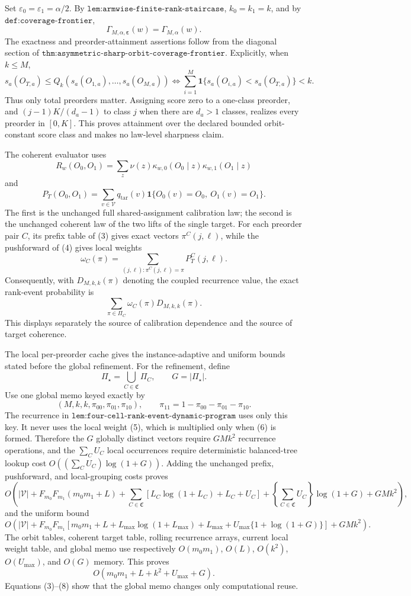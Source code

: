 Set \(\varepsilon_0=\varepsilon_1=\alpha/2\). By \(\texttt{lem:armwise-finite-rank-staircase}\), \(k_0=k_1=k\), and by \(\texttt{def:coverage-frontier}\),
\[
\Gamma_{M,\alpha,\boldsymbol\varepsilon}(w)=\Gamma_{M,\alpha}(w). \tag{1}
\]
The exactness and preorder-attainment assertions follow from the diagonal section of \(\texttt{thm:asymmetric-sharp-orbit-coverage-frontier}\). Explicitly, when \(k\le M\),
\[
s_a(O_{T,a})\le Q_k(s_a(O_{1,a}),\ldots,s_a(O_{M,a}))\Longleftrightarrow\sum_{i=1}^M\mathbf 1\{s_a(O_{i,a})<s_a(O_{T,a})\}<k. \tag{2}
\]
Thus only total preorders matter. Assigning score zero to a one-class preorder, and \((j-1)K/(d_a-1)\) to class \(j\) when there are \(d_a>1\) classes, realizes every preorder in \([0,K]\). This proves attainment over the declared bounded orbit-constant score class and makes no law-level sharpness claim.

The coherent evaluator uses
\[
R_w(O_0,O_1)=\sum_z\nu(z)\kappa_{w,0}(O_0\mid z)\kappa_{w,1}(O_1\mid z) \tag{3}
\]
and
\[
P_T(O_0,O_1)=\sum_{v\in\mathcal V}q_{\mathrm{tar}}(v)\mathbf 1\{O_0(v)=O_0,\ O_1(v)=O_1\}. \tag{4}
\]
The first is the unchanged full shared-assignment calibration law; the second is the unchanged coherent law of the two lifts of the single target. For each preorder pair \(C\), its prefix table of (3) gives exact vectors \(\pi^C(j,\ell)\), while the pushforward of (4) gives local weights
\[
\omega_C(\pi)=\sum_{(j,\ell):\pi^C(j,\ell)=\pi}P_T^C(j,\ell). \tag{5}
\]
Consequently, with \(D_{M,k,k}(\pi)\) denoting the coupled recurrence value, the exact rank-event probability is
\[
\sum_{\pi\in\Pi_C}\omega_C(\pi)D_{M,k,k}(\pi). \tag{6}
\]
This displays separately the source of calibration dependence and the source of target coherence.

The local per-preorder cache gives the instance-adaptive and uniform bounds stated before the global refinement. For the refinement, define
\[
\Pi_\star=\bigcup_{C\in\mathfrak C}\Pi_C,\qquad G=|\Pi_\star|. \tag{7}
\]
Use one global memo keyed exactly by
\[
(M,k,k,\pi_{00},\pi_{01},\pi_{10}),\qquad \pi_{11}=1-\pi_{00}-\pi_{01}-\pi_{10}. \tag{8}
\]
The recurrence in \(\texttt{lem:four-cell-rank-event-dynamic-program}\) uses only this key. It never uses the local weight (5), which is multiplied only when (6) is formed. Therefore the \(G\) globally distinct vectors require \(GMk^2\) recurrence operations, and the \(\sum_CU_C\) local occurrences require deterministic balanced-tree lookup cost \(O((\sum_CU_C)\log(1+G))\). Adding the unchanged prefix, pushforward, and local-grouping costs proves
\[
O\!\left(
|\mathcal V|+F_{m_0}F_{m_1}(m_0m_1+L)+\sum_{C\in\mathfrak C}\left[L_C\log(1+L_C)+L_C+U_C\right]+\left\{\sum_{C\in\mathfrak C}U_C\right\}\log(1+G)+GMk^2
\right), \tag{9}
\]
and the uniform bound
\[
O\!\left(|\mathcal V|+F_{m_0}F_{m_1}\left[m_0m_1+L+L_{\max}\log(1+L_{\max})+L_{\max}+U_{\max}\{1+\log(1+G)\}\right]+GMk^2\right). \tag{10}
\]
The orbit tables, coherent target table, rolling recurrence arrays, current local weight table, and global memo use respectively \(O(m_0m_1)\), \(O(L)\), \(O(k^2)\), \(O(U_{\max})\), and \(O(G)\) memory. This proves
\[
O(m_0m_1+L+k^2+U_{\max}+G). \tag{11}
\]
Equations (3)--(8) show that the global memo changes only computational reuse.


